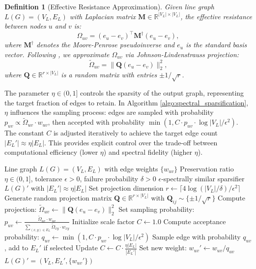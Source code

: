 \documentclass[pdflatex,sn-mathphys-num]{sn-jnl}%
\theoremstyle{thmstyleone}%
\theoremstyle{thmstyletwo}%
\theoremstyle{thmstylethree}%
\newtheorem{definition}{Definition}%
\theoremstyle{plain} %
\theoremstyle{definition} %
\theoremstyle{remark} %
\theoremstyle{plain} %
\begin{document}
\begin{definition}[Effective Resistance Approximation]
Given line graph $L(G) = (V_L, E_L)$ with Laplacian matrix $\mathbf{M} \in \mathbb{R}^{|V_L| \times |V_L|}$, the effective resistance between nodes $u$ and $v$ is:
\[
\Omega_{uv} = (e_u - e_v)^\top \mathbf{M}^\dagger (e_u - e_v),
\]
where $\mathbf{M}^\dagger$ denotes the Moore-Penrose pseudoinverse and $e_u$ is the standard basis vector. Following \cite{spielman2011graph, cohen2015nearly}, we approximate $\Omega_{uv}$ via Johnson-Lindenstrauss projection:
\[
\tilde{\Omega}_{uv} = \|\mathbf{Q}(e_u - e_v)\|_2^2,
\]
where $\mathbf{Q} \in \mathbb{R}^{r \times |V_L|}$ is a random matrix with entries $\pm 1/\sqrt{r}$.
\end{definition}


The parameter $\eta \in (0, 1]$ controls the sparsity of the output graph, representing the target fraction of edges to retain. 
In Algorithm \ref{algo:spectral_sparsification}, $\eta$ influences the sampling process: 
edges are sampled with probability $p_{uv} \propto \tilde{\Omega}_{uv} \cdot w_{uv}$, 
then accepted with probability $\min(1, C \cdot p_{uv} \cdot \log |V_L| / \epsilon^2)$. 
The constant $C$ is adjusted iteratively to achieve the target edge count $|E_L'| \approx \eta |E_L|$. 
This provides explicit control over the trade-off between computational efficiency (lower $\eta$) and spectral fidelity (higher $\eta$).

\begin{algorithm}[!ht]
\caption{Approximate Spectral Sparsification with Preservation Control}
\label{algo:spectral_sparsification}
\begin{algorithmic}[1]
\Require Line graph $L(G) = (V_L, E_L)$ with edge weights $\{w_{uv}\}$
\Require Preservation ratio $\eta \in (0, 1]$, tolerance $\epsilon > 0$, failure probability $\delta > 0$
\Ensure $\epsilon$-spectrally similar sparsifier $L(G)'$ with $|E_L'| \approx \eta |E_L|$
\State Set projection dimension $r \gets \lceil 4\log(|V_L|/\delta)/\epsilon^2 \rceil$
\State Generate random projection matrix $\mathbf{Q} \in \mathbb{R}^{r \times |V_L|}$ with $\mathbf{Q}_{ij} \sim \{\pm 1/\sqrt{r}\}$
    \State Compute projection: $\tilde{\Omega}_{uv} \gets \|\mathbf{Q}(e_u - e_v)\|_2^2$ 
    \State Set sampling probability: $p_{uv} \gets \frac{\tilde{\Omega}_{uv} \cdot w_{uv}}{\sum_{(x,y) \in E_L} \tilde{\Omega}_{xy} \cdot w_{xy}}$
\EndFor
\State Initialize scale factor $C \gets 1.0$
\Repeat
        \State Compute acceptance probability: $q_{uv} \gets \min(1, C \cdot p_{uv} \cdot \log |V_L| / \epsilon^2)$
        \State Sample edge with probability $q_{uv}$, add to $E_L'$ if selected
    \EndFor
    \State Update $C \gets C \cdot \frac{\eta |E_L|}{|E_L'|}$ 
 
    \State Set new weight: $w_{uv}' \gets w_{uv} / q_{uv}$ 
\EndFor
\State \Return $L(G)' = (V_L, E_L', \{w_{uv}'\})$
\end{algorithmic}
\end{algorithm}
\end{document}
